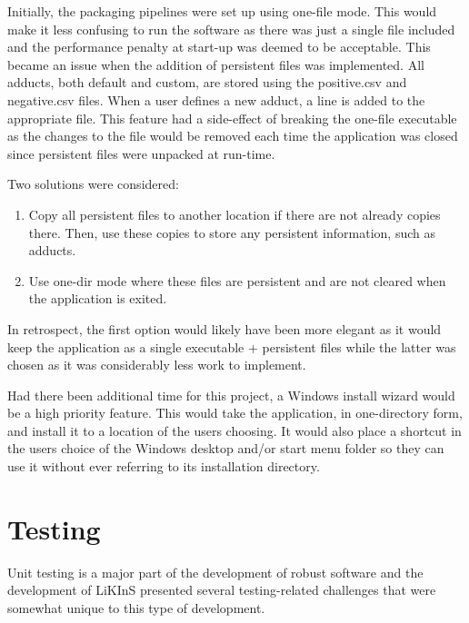 \documentclass{l4proj}
\begin{document}
Initially, the packaging pipelines were set up using one-file mode. This would make it less confusing to run the software as there was just a single file included and the performance penalty at start-up was deemed to be acceptable. This became an issue when the addition of persistent files was implemented. All adducts, both default and custom, are stored using the positive.csv and negative.csv files. When a user defines a new adduct, a line is added to the appropriate file. This feature had a side-effect of breaking the one-file executable as the changes to the file would be removed each time the application was closed since persistent files were unpacked at run-time.

Two solutions were considered:
\begin{enumerate}
    \item Copy all persistent files to another location if there are not already copies there. Then, use these copies to store any persistent information, such as adducts.
    \item Use one-dir mode where these files are persistent and are not cleared when the application is exited.
\end{enumerate}
In retrospect, the first option would likely have been more elegant as it would keep the application as a single executable + persistent files while the latter was chosen as it was considerably less work to implement.

Had there been additional time for this project, a Windows install wizard would be a high priority feature. This would take the application, in one-directory form, and install it to a location of the users choosing. It would also place a shortcut in the users choice of the Windows desktop and/or start menu folder so they can use it without ever referring to its installation directory.


\section{Testing}\label{testing}
Unit testing is a major part of the development of robust software and the development of LiKInS presented several testing-related challenges that were somewhat unique to this type of development.
\end{document}
